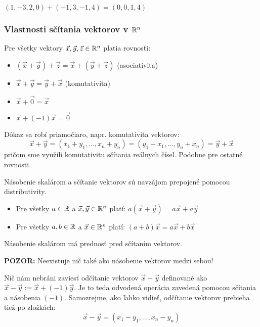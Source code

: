 \begin{example}
$(1,-3,2,0) + (-1,3,-1,4) = (0,0,1,4)$
\end{example}

\subsubsection{Vlastnosti sčítania vektorov v $\mathbb{R}^n$}
Pre všetky vektory $\vec{x}, \vec{y}, \vec{z} \in \mathbb{R}^n$ platia rovnosti:
\begin{itemize}
    \item $(\vec{x}+\vec{y})+\vec{z} = \vec{x}+(\vec{y}+\vec{z})$ (asociativita)
    \item $\vec{x}+\vec{y} = \vec{y}+\vec{x}$ (komutativita)
    \item $\vec{x}+\vec{0} = \vec{x}$
    \item $\vec{x}+(-1)\vec{x} = \vec{0}$
\end{itemize}
Dôkaz sa robí priamočiaro, napr. komutativita vektorov:
$$ \vec{x}+\vec{y} = (x_1+y_1, \dots, x_n+y_n) = (y_1+x_1, \dots, y_n+x_n) = \vec{y}+\vec{x} $$
pričom sme využili komutativitu sčítania reálnych čísel. Podobne pre ostatné rovnosti.



Násobenie skalárom a sčítanie vektorov sú navzájom prepojené pomocou distributivity.
\begin{itemize}
    \item Pre všetky $a \in \mathbb{R}$ a $\vec{x}, \vec{y} \in \mathbb{R}^n$ platí: $a(\vec{x}+\vec{y}) = a\vec{x} + a\vec{y}$
    \item Pre všetky $a,b \in \mathbb{R}$ a $\vec{x} \in \mathbb{R}^n$ platí: $(a+b)\vec{x} = a\vec{x} + b\vec{x}$
\end{itemize}
Násobenie skalárom má prednosť pred sčítaním vektorov.

\noindent\textbf{POZOR:} Neexistuje nič také ako násobenie vektorov medzi sebou!

Nič nám nebráni zaviesť odčítanie vektorov $\vec{x}-\vec{y}$ definované ako $\vec{x}-\vec{y} := \vec{x} + (-1)\vec{y}$. Je to teda odvodená operácia zavedená pomocou sčítania a násobenia $(-1)$. Samozrejme, ako ľahko vidieť, odčítanie vektorov prebieha tiež po zložkách:
$$ \vec{x}-\vec{y} = (x_1-y_1, \dots, x_n-y_n) $$



